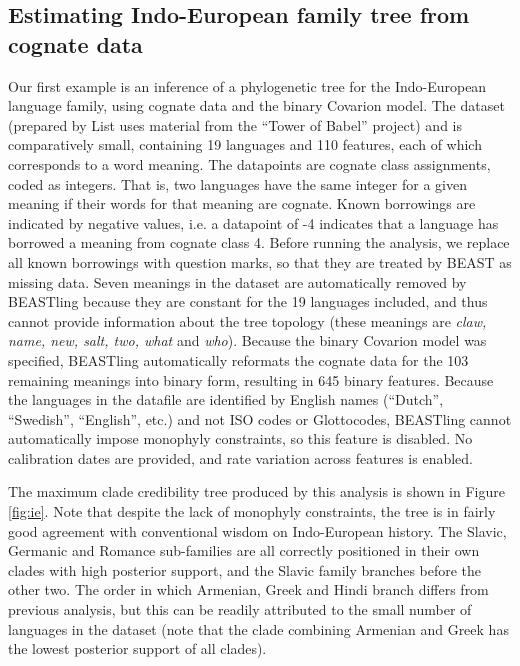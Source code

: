 \documentclass[10pt,a4paper]{article}
\begin{document}
\subsection{Estimating Indo-European family tree from cognate data}

Our first example is an inference of a phylogenetic tree for the Indo-European language family, using cognate data and the binary Covarion model.  The dataset\cite{List2014a} (prepared by List\cite{List2014} uses material from the ``Tower of Babel'' project\cite{Starostin2008}) and is comparatively small, containing 19 languages and 110 features, each of which corresponds to a word meaning.  The datapoints are cognate class assignments, coded as integers.  That is, two languages have the same integer for a given meaning if their words for that meaning are cognate.  Known borrowings are indicated by negative values, i.e. a datapoint of -4 indicates that a language has borrowed a meaning from cognate class 4.  Before running the analysis, we replace all known borrowings with question marks, so that they are treated by BEAST as missing data.  Seven meanings in the dataset are automatically removed by BEASTling because they are constant for the 19 languages included, and thus cannot provide information about the tree topology (these meanings are \emph{claw, name, new, salt, two, what} and \emph{who}).  Because the binary Covarion model was specified, BEASTling automatically reformats the cognate data for the 103 remaining meanings into binary form, resulting in 645 binary features.  Because the languages in the datafile are identified by English names (``Dutch'', ``Swedish'', ``English'', etc.) and not ISO codes or Glottocodes, BEASTling cannot automatically impose monophyly constraints, so this feature is disabled.  No calibration dates are provided, and rate variation across features is enabled.

The maximum clade credibility tree produced by this analysis is shown in Figure \ref{fig:ie}.  Note that despite the lack of monophyly constraints, the tree is in fairly good agreement with conventional wisdom on Indo-European history.  The Slavic, Germanic and Romance sub-families are all correctly positioned in their own clades with high posterior support, and the Slavic family branches before the other two.  The order in which Armenian, Greek and Hindi branch differs from previous analysis\cite{Gray2003,Bouckaert2012}, but this can be readily attributed to the small number of languages in the dataset (note that the clade combining Armenian and Greek has the lowest posterior support of all clades).
\end{document}
